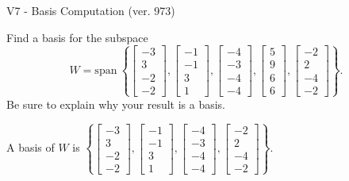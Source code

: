 \begin{exercise}
  \begin{exerciseTitle}V7 - Basis Computation (ver. 973)\end{exerciseTitle}
  \begin{exerciseStatement}
    Find a basis for the subspace 
\[W=\mathrm{span}\ \left\{\left[\begin{array}{r}
-3 \\
3 \\
-2 \\
-2
\end{array}\right] , \left[\begin{array}{r}
-1 \\
-1 \\
3 \\
1
\end{array}\right] , \left[\begin{array}{r}
-4 \\
-3 \\
-4 \\
-4
\end{array}\right] , \left[\begin{array}{r}
5 \\
9 \\
6 \\
6
\end{array}\right] , \left[\begin{array}{r}
-2 \\
2 \\
-4 \\
-2
\end{array}\right]\right\}.\]
 Be sure to explain why your result is a basis.


  \end{exerciseStatement}
  \begin{exerciseAnswer}
   A basis of \(W\) is  \(\left\{\left[\begin{array}{r}
-3 \\
3 \\
-2 \\
-2
\end{array}\right] , \left[\begin{array}{r}
-1 \\
-1 \\
3 \\
1
\end{array}\right] , \left[\begin{array}{r}
-4 \\
-3 \\
-4 \\
-4
\end{array}\right] , \left[\begin{array}{r}
-2 \\
2 \\
-4 \\
-2
\end{array}\right]\right\}\).
  


  \end{exerciseAnswer}
\end{exercise}